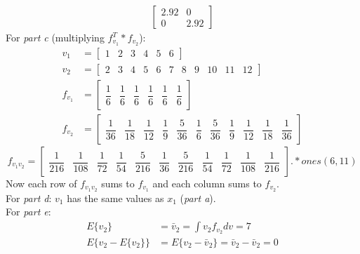 \documentclass[11pt]{article}
\begin{document}
\begin{enumerate}[label=\textbf{\arabic*.}]
\begin{equation*}
\begin{split}
\begin{bmatrix}
        2.92 & 0 \\ 0 & 2.92
      \end{bmatrix}
    \end{split}
  \end{equation*}
  For \emph{part c} (multiplying $f_{v_1}^T*f_{v_2}$):
  \begin{equation*}
    \begin{split}
      v_1 &= 
      \begin{bmatrix} 
        1 & 2 & 3 & 4 & 5 & 6 
      \end{bmatrix}
      \\
      v_2 &= 
      \begin{bmatrix} 
        2 & 3 & 4 & 5 & 6 & 7 & 8 & 9 & 10 & 11 & 12 
      \end{bmatrix}
      \\
      f_{v_1} &=
      \begin{bmatrix}
        \dfrac{1}{6} & \dfrac{1}{6} & \dfrac{1}{6} & \dfrac{1}{6} & \dfrac{1}{6} & \dfrac{1}{6}
      \end{bmatrix}
      \\
      f_{v_2} &=
      \begin{bmatrix}
        \dfrac{1}{36} & \dfrac{1}{18} & \dfrac{1}{12} & \dfrac{1}{9} & \dfrac{5}{36} & \dfrac{1}{6} & \dfrac{5}{36} & \dfrac{1}{9} & \dfrac{1}{12} & \dfrac{1}{18} & \dfrac{1}{36}
      \end{bmatrix}
    \end{split}
  \end{equation*}
  \begin{equation*}
    f_{v_1v_2} = 
    \begin{bmatrix}
      \dfrac{1}{216} & \dfrac{1}{108} & \dfrac{1}{72} & \dfrac{1}{54} & \dfrac{5}{216} & \dfrac{1}{36} & \dfrac{5}{216} & \dfrac{1}{54} & \dfrac{1}{72} & \dfrac{1}{108} & \dfrac{1}{216}
    \end{bmatrix}
    .*ones(6,11)
  \end{equation*}
  Now each row of $f_{v_1v_2}$ sums to $f_{v_1}$ and each column sums to $f_{v_2}$. \\
  For \emph{part d}: $v_1$ has the same values as $x_1$ (\emph{part a}).\\
  For \emph{part e}:
  \begin{equation*}
    \begin{split}
      E\{v_2\} &= \bar{v}_2 = \int v_2f_{v_2}dv = 7 \\
      E\{v_2-E\{v_2\}\} &= E\{v_2-\bar{v}_2\} = \bar{v}_2 - \bar{v}_2 = 0 \\

\end{split}
\end{equation*}
\end{enumerate}
\end{document}
